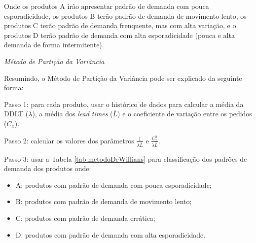 \documentclass{book}
\begin{document}
Onde os produtos A irão apresentar padrão de demanda com pouca esporadicidade, os produtos B terão padrão de demanda de movimento lento, os produtos C terão padrão de demanda frenquente, mas com alta variação, e o produtos D terão padrão de demanda com alta esporadicidade (pouca e alta demanda de forma intermitente).

\emph{Método de Partição da Variância}

Resumindo, o Método de Partição da Variância pode ser explicado da seguinte forma:

Passo 1: para cada produto, usar o histórico de dados para calcular a média da DDLT ($\lambda$), a média dos \emph{lead times} ($\overline{L}$) e o coeficiente de variação entre os pedidos ($C_x$).

Passo 2: calcular os valores dos parâmetros $\frac{1}{\lambda \overline{L}}$ e $\frac{C_x^2}{\lambda \overline{L}}$.

Passo 3: usar a Tabela \ref{tab:metodoDeWillians} para classificação dos padrões de demanda dos produtos onde:

\begin{itemize}
\item A: produtos com padrão de demanda com pouca esporadicidade;
\item B: produtos com padrão de demanda de movimento lento;
\item C: produtos com padrão de demanda errática;
\item D: produtos com padrão de demanda com alta esporadicidade.
\end{itemize}
\end{document}
